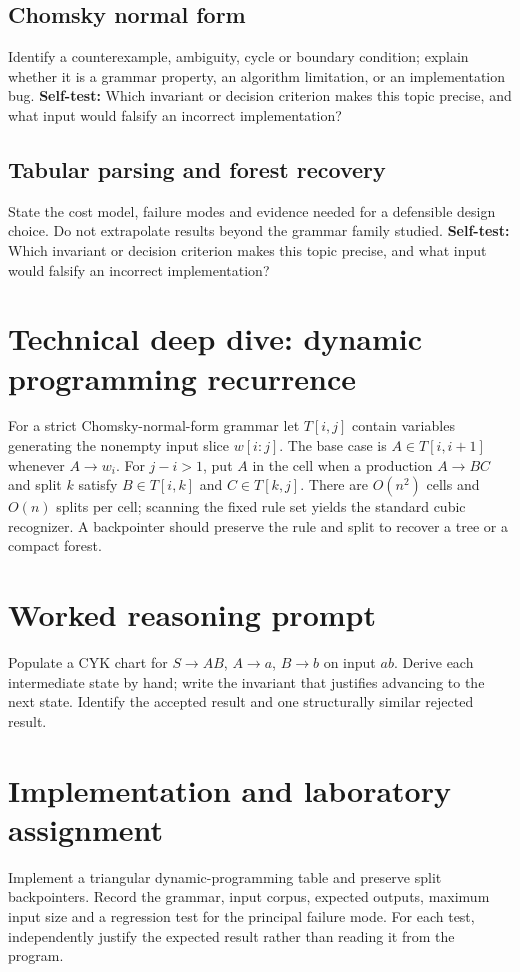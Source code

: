 \documentclass[11pt,letterpaper]{article}
\begin{document}
\subsection{Chomsky normal form}
Identify a counterexample, ambiguity, cycle or boundary condition; explain whether it is a grammar property, an algorithm limitation, or an implementation bug.
\textbf{Self-test:} Which invariant or decision criterion makes this topic precise, and what input would falsify an incorrect implementation?
\subsection{Tabular parsing and forest recovery}
State the cost model, failure modes and evidence needed for a defensible design choice. Do not extrapolate results beyond the grammar family studied.
\textbf{Self-test:} Which invariant or decision criterion makes this topic precise, and what input would falsify an incorrect implementation?
\section{Technical deep dive: dynamic programming recurrence}
For a strict Chomsky-normal-form grammar let $T[i,j]$ contain variables generating the nonempty input slice $w[i:j]$. The base case is $A\in T[i,i+1]$ whenever $A\to w_i$. For $j-i>1$, put $A$ in the cell when a production $A\to BC$ and split $k$ satisfy $B\in T[i,k]$ and $C\in T[k,j]$. There are $O(n^2)$ cells and $O(n)$ splits per cell; scanning the fixed rule set yields the standard cubic recognizer. A backpointer should preserve the rule and split to recover a tree or a compact forest.
\section{Worked reasoning prompt}
Populate a CYK chart for $S\to AB$, $A\to a$, $B\to b$ on input $ab$. Derive each intermediate state by hand; write the invariant that justifies advancing to the next state. Identify the accepted result and one structurally similar rejected result.
\section{Implementation and laboratory assignment}
Implement a triangular dynamic-programming table and preserve split backpointers. Record the grammar, input corpus, expected outputs, maximum input size and a regression test for the principal failure mode. For each test, independently justify the expected result rather than reading it from the program.
\end{document}
